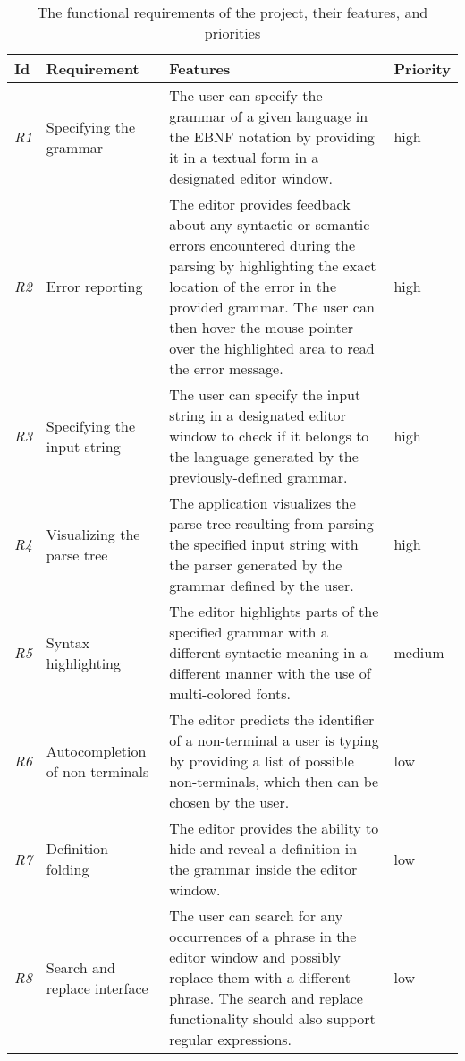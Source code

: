 \documentclass[english,engineering]{wizthesis}
\begin{document}
\begin{table}[H]
  \centering
  \caption{The functional requirements of the project, their features, and
  priorities}
  \label{tab:functional-requirements}
  \begin{tabularx}{\textwidth}{@{}lL{3cm}Xl@{}}
    \toprule
    Id & Requirement & Features & Priority \\
    \midrule
    \emph{R1} & Specifying the grammar & The user can specify the grammar of a
    given language in the EBNF notation by providing it in a textual form in
    a designated editor window. & high \\
    \addlinespace[0.5em] \emph{R2} & Error reporting & The editor provides
    feedback about any syntactic or semantic errors encountered during the
    parsing by highlighting the exact location of the error in the provided
    grammar. The user can then hover the mouse pointer over the highlighted area
    to read the error message. & high \\
    \addlinespace[0.5em] \emph{R3} & Specifying the input string & The user can
    specify the input string in a designated editor window to check if it
    belongs to the language generated by the previously-defined grammar. & high
    \\
    \addlinespace[0.5em] \emph{R4} & Visualizing the parse tree & The
    application visualizes the parse tree resulting from parsing the specified
    input string with the parser generated by the grammar defined by the user. &
    high \\
    \addlinespace[0.5em] \emph{R5} & Syntax highlighting & The editor highlights
    parts of the specified grammar with a different syntactic meaning in a
    different manner with the use of multi-colored fonts. & medium \\
    \addlinespace[0.5em] \emph{R6} & Autocompletion of non-terminals & The
    editor predicts the identifier of a non-terminal a user is typing by
    providing a list of possible non-terminals, which then can be chosen by the
    user. & low \\
    \addlinespace[0.5em] \emph{R7} & Definition folding & The editor provides
    the ability to hide and reveal a definition in the grammar inside the editor
    window. & low \\
    \addlinespace[0.5em] \emph{R8} & Search and replace interface & The user can
    search for any occurrences of a phrase in the editor window and possibly
    replace them with a different phrase. The search and replace functionality
    should also support regular expressions. & low \\
    \bottomrule
  \end{tabularx}
\end{table}
\end{document}
